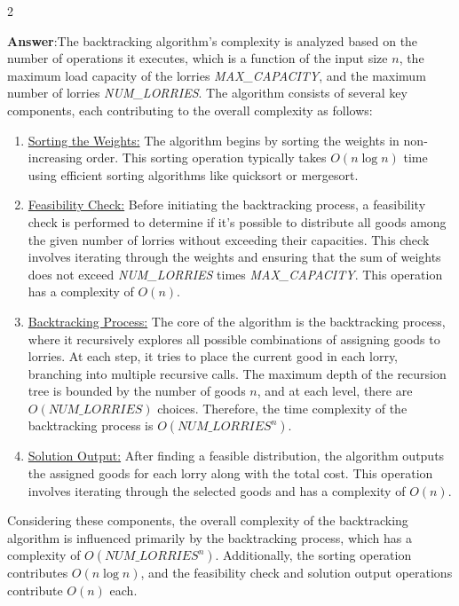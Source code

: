 \documentclass{article}
\begin{document}
\begin{multicols}{2}
\begin{itemize}
	      \textbf{Answer}:\quad The backtracking algorithm's complexity is analyzed based on the number of operations it executes, which is a function of the input size \(n\), the maximum load capacity of the lorries \textit{MAX\_CAPACITY}, and the maximum number of lorries \textit{NUM\_LORRIES}. The algorithm consists of several key components, each contributing to the overall complexity as follows:

	      \begin{enumerate}
		      \item \underline{Sorting the Weights:} The algorithm begins by sorting the weights in non-increasing order.
		            This sorting operation typically takes \(O(n \log n)\) time using efficient sorting algorithms like quicksort or mergesort.

		      \item \underline{Feasibility Check:} Before initiating the backtracking process, a feasibility check is performed to determine
		            if it's possible to distribute all goods among the given number of lorries without exceeding their capacities. This check involves iterating through the weights and ensuring that the sum of weights does not exceed \textit{NUM\_LORRIES} times \textit{MAX\_CAPACITY}. This operation has a complexity of \(O(n)\).

		      \item \underline{Backtracking Process:} The core of the algorithm is the backtracking process, where it recursively
		            explores all possible combinations of assigning goods to lorries. At each step, it tries to place the current good in each lorry,
		            branching into multiple recursive calls. The maximum depth of the recursion tree is bounded by the number of goods \(n\),
		            and at each level, there are \(O(\textit{NUM\_LORRIES})\) choices. Therefore, the time complexity of the backtracking
		            process is \(O(\textit{NUM\_LORRIES}^n)\).

		      \item \underline{Solution Output:} After finding a feasible distribution, the algorithm outputs the assigned goods for each lorry along with the total cost. This operation involves iterating through the selected goods and has a complexity of \(O(n)\).
	      \end{enumerate}

	      Considering these components, the overall complexity of the backtracking algorithm is influenced primarily by the backtracking process, which has a complexity of \(O(\textit{NUM\_LORRIES}^n)\). Additionally, the sorting operation contributes \(O(n \log n)\), and the feasibility check and solution output operations contribute \(O(n)\) each.


\end{itemize}
\end{multicols}
\end{document}
